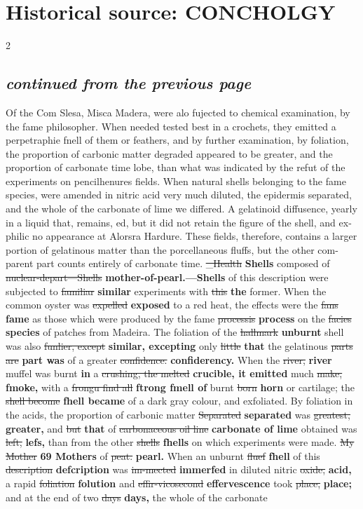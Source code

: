 \documentclass[10pt]{article}
\begin{document}
\section*{Historical source: CONCHOLGY}
\begin{multicols}{2}
\subsection*{\textit{continued from the previous page}}
Of the Com Slesa, Misca Madera, were alo fujected to chemical examination, by the fame philosopher. When needed tested best in a crochets, they emitted a perpetraphie fnell of them or feathers, and by further examination, by foliation, the proportion of carbonic matter degraded appeared to be greater, and the proportion of carbonate time lobe, than what was indicated by the refut of the experiments on pencilhenures fields. When natural shells belonging to the fame species, were amended in nitric acid very much diluted, the epidermis separated, and the whole of the carbonate of lime we differed. A gelatinoid diffusence, yearly in a liquid that, remains, ed, but it did not retain the figure of the shell, and ex-philic no appearance at Alorsra Hardure. These fields, therefore, contains a larger portion of gelatinous matter than the porcellaneous fluffs, but the other com-parent part counts entirely of carbonate time. \sout{\_Health} \textbf{Shells} composed of \sout{nuclear-depart—Shells} \textbf{mother-of-pearl.—Shells} of this description were subjected to \sout{familiar} \textbf{similar} experiments with \sout{this} \textbf{the} former. When the common oyster was \sout{expelled} \textbf{exposed} to a red heat, the effects were the \sout{fans} \textbf{fame} as those which were produced by the fame \sout{processis} \textbf{process} on the \sout{facies} \textbf{species} of patches from Madeira. The foliation of the \sout{hallmark} \textbf{unburnt} shell was also \sout{funlier, except} \textbf{similar, excepting} only \sout{little} \textbf{that} the gelatinous \sout{parts are} \textbf{part was} of a greater \sout{confidence.} \textbf{confiderency.} When the \sout{river,} \textbf{river} muffel was burnt \textbf{in} a \sout{crushing, the melted} \textbf{crucible, it emitted} much \sout{make,} \textbf{fmoke,} with a \sout{frongu find all} \textbf{ftrong fmell of} burnt \sout{born} \textbf{horn} or cartilage; the \sout{shell become} \textbf{fhell became} of a dark gray colour, and exfoliated. By foliation in the acids, the proportion of carbonic matter \sout{Separated} \textbf{separated} was \sout{greatest,} \textbf{greater,} and \sout{but} \textbf{that} of \sout{carbonaceous oil line} \textbf{carbonate of lime} obtained was \sout{left,} \textbf{lefs,} than from the other \sout{shells} \textbf{fhells} on which experiments were made. \sout{My Mother} \textbf{69 Mothers} of \sout{peat.} \textbf{pearl.} When an unburnt \sout{fluef} \textbf{fhell} of this \sout{description} \textbf{defcription} was \sout{im-mected} \textbf{immerfed} in diluted nitric \sout{oxide,} \textbf{acid,} a rapid \sout{foliation} \textbf{folution} and \sout{effir-vicosecond} \textbf{effervescence} took \sout{place,} \textbf{place;} and at the end of two \sout{days} \textbf{days,} the whole of the carbonate 
\end{multicols}
\end{document}
